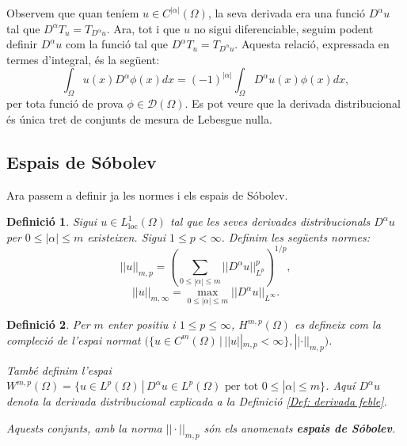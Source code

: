 \documentclass{article}
\numberwithin{equation}{section}
\newtheorem{definicio}{Definici\'{o}}[section]
\begin{document}
Observem que quan ten\'{i}em $u\in C^{|\alpha|}(\Omega)$, la seva derivada era una funci\'{o} $D^{\alpha}u$ tal que $D^{\alpha}T_u=T_{D^{\alpha}u}$. Ara, tot i que $u$ no sigui diferenciable, seguim podent definir $D^{\alpha}u$ com la funci\'{o} tal que $D^{\alpha}T_u=T_{D^{\alpha}u}$. Aquesta relaci\'{o}, expressada en termes d'integral, \'{e}s la seg\"{u}ent:
\begin{equation}
\int_{\Omega}u(x)D^{\alpha}\phi(x)dx=(-1)^{|\alpha|}\int_{\Omega}D^{\alpha}u(x)\phi(x)dx,
\end{equation}
per tota funci\'{o} de prova $\phi\in\mathcal{D}(\Omega)$. Es pot veure que la derivada distribucional \'{e}s \'{u}nica tret de conjunts de mesura de Lebesgue nul\textperiodcentered la.

\subsection{Espais de S\'{o}bolev}

Ara passem a definir ja les normes i els espais de S\'{o}bolev.

\begin{definicio}
Sigui $u\in L_{\text{loc}}^1(\Omega)$ tal que les seves derivades distribucionals $D^{\alpha}u$ per $0\leq|\alpha|\leq m$ existeixen. Sigui $1\leq p<\infty$. Definim les seg\"{u}ents normes:
\begin{equation}||u||_{m,p}=\left(\sum_{0\leq|\alpha|\leq m}||D^{\alpha}u||_{L^p}^p\right)^{1/p},
\end{equation}
\begin{equation}
||u||_{m,\infty}=\max_{0\leq|\alpha|\leq m}||D^{\alpha}u||_{L^{\infty}}.
\end{equation}
\end{definicio}

\begin{definicio}
Per $m$ enter positiu i $1\leq p\leq\infty$, $H^{m,p}(\Omega)$ es defineix com la compleci\'{o} de l'espai normat $\big(\{u\in C^m(\Omega)\,|\,||u||_{m,p}<\infty\},||\cdot||_{m,p}\big)$.

Tamb\'{e} definim l'espai $W^{m,p}(\Omega)=\{u\in L^p(\Omega)\,|\,D^{\alpha}u\in L^p(\Omega)\text{ per tot }0\leq|\alpha|\leq m\}$. Aqu\'{i} $D^{\alpha}u$ denota la derivada distribucional explicada a la Definici\'{o} \ref{Def: derivada feble}.

Aquests conjunts, amb la norma $||\cdot||_{m,p}$ s\'{o}n els anomenats \textbf{espais de S\'{o}bolev}.
\end{definicio}
\end{document}
